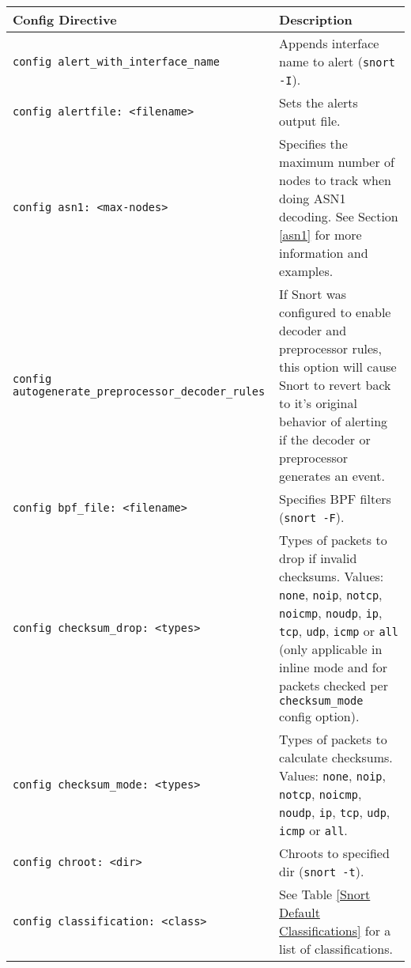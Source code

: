 \documentclass[english]{report}
\begin{document}
\newpage
\begin{center}
\begin{longtable}[t]{| p{2.5in} | p{3.5in} |}

\hline
{\bf Config Directive} & {\bf Description}\\
\hline

\hline
\texttt{config alert\_with\_interface\_name} & Appends interface name to alert
(\texttt{snort -I}). \\

\hline
\texttt{config alertfile: <filename>} & Sets the alerts output file. \\

\hline
\texttt{config asn1: <max-nodes>} & Specifies the maximum number of nodes to track when
doing ASN1 decoding. See Section \ref{asn1} for more information and
examples.\\

\hline
\texttt{config autogenerate\_preprocessor\newline \_decoder\_rules} & If Snort was
configured to enable decoder and preprocessor rules, this option will cause
Snort to revert back to it's original behavior of alerting if the decoder or
preprocessor generates an event. \\

\hline
\texttt{config bpf\_file: <filename>} & Specifies BPF filters (\texttt{snort
-F}). \\

\hline
\texttt{config checksum\_drop: <types>} & Types of packets to drop if invalid
checksums. Values: \texttt{none}, \texttt{noip}, \texttt{notcp},
\texttt{noicmp}, \texttt{noudp}, \texttt{ip}, \texttt{tcp}, \texttt{udp},
\texttt{icmp} or \texttt{all} (only applicable in inline mode and for packets
checked per \texttt{checksum\_mode} config option). \\

\hline
\texttt{config checksum\_mode: <types>} & Types of packets to calculate checksums.
Values: \texttt{none}, \texttt{noip}, \texttt{notcp}, \texttt{noicmp},
\texttt{noudp}, \texttt{ip}, \texttt{tcp}, \texttt{udp}, \texttt{icmp} or
\texttt{all}. \\

\hline
\texttt{config chroot: <dir>} & Chroots to specified dir (\texttt{snort
-t}). \\

\hline
\texttt{config classification: <class>} & See Table
\ref{Snort Default Classifications} for a list of classifications.\\


\end{longtable}
\end{center}
\end{document}
